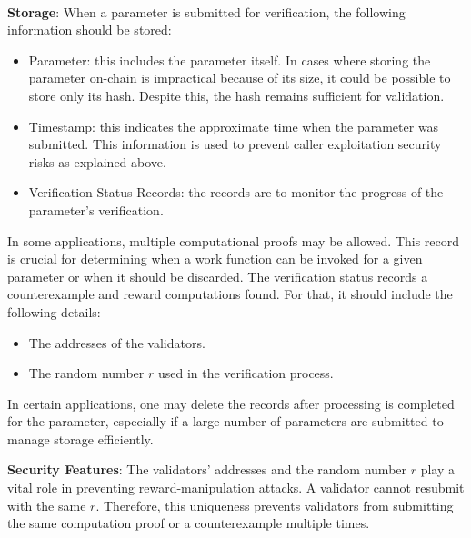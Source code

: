 \documentclass[runningheads]{llncs}
\begin{document}
\\ \textbf{Storage}:
When a parameter is submitted for verification, the following information should be stored:
\begin{itemize}
\item Parameter: this includes the parameter itself. In cases where storing the parameter on-chain is impractical because of its size, it could be possible to store only its hash. Despite this, the hash remains sufficient for validation.
\item Timestamp: this indicates the approximate time when the parameter was submitted. This information is used to prevent caller exploitation security risks as explained above.
\item Verification Status Records: the records are to monitor the progress of the parameter's verification.
\end{itemize}

In some applications, multiple computational proofs may be allowed. This record is crucial for determining when a work function can be invoked for a given parameter or when it should be discarded. The verification status records a counterexample and reward computations found. For that, it should include the following details:
\begin{itemize}
    \item The addresses of the validators.
    \item The random number $r$ used in the verification process.
\end{itemize}


In certain applications, one may delete the records after processing is completed for the parameter, especially if a large number of parameters are submitted to manage storage efficiently.

\textbf{Security Features}:
The validators' addresses and the random number $r$ play a vital role in preventing reward-manipulation attacks. A validator cannot resubmit with the same $r$. Therefore, this uniqueness prevents validators from submitting the same computation proof or a counterexample multiple times.
\end{document}
